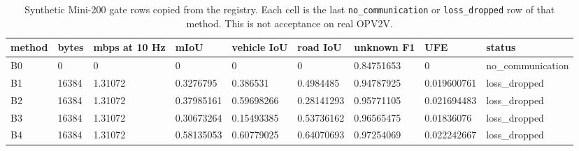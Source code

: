 \begin{table}[t]
\centering
\caption{Synthetic Mini-200 gate rows copied from the registry. Each cell is the last \texttt{no\_communication} or \texttt{loss\_dropped} row of that method. This is not acceptance on real OPV2V.}
\label{tab:gate3}
\scriptsize
\setlength{\tabcolsep}{3pt}
\begin{tabular}{lllllllll}
\toprule
method & bytes & mbps at 10 Hz & mIoU & vehicle IoU & road IoU & unknown F1 & UFE & status \\
\midrule
B0 & 0 & 0 & 0 & 0 & 0 & 0.84751653 & 0 & no\_communication \\
B1 & 16384 & 1.31072 & 0.3276795 & 0.386531 & 0.4984485 & 0.94787925 & 0.019600761 & loss\_dropped \\
B2 & 16384 & 1.31072 & 0.37985161 & 0.59698266 & 0.28141293 & 0.95771105 & 0.021694483 & loss\_dropped \\
B3 & 16384 & 1.31072 & 0.30673264 & 0.15493385 & 0.53736162 & 0.96565475 & 0.01836076 & loss\_dropped \\
B4 & 16384 & 1.31072 & 0.58135053 & 0.60779025 & 0.64070693 & 0.97254069 & 0.022242667 & loss\_dropped \\
\bottomrule
\end{tabular}
\end{table}
